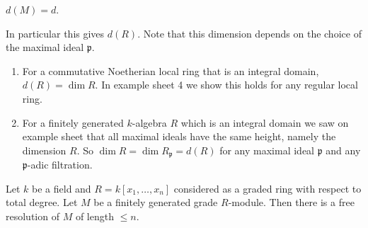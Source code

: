 \documentclass[a4paper]{article}
\begin{document}
\begin{definition}
  \(d(M) = d\).
\end{definition}

In particular this gives \(d(R)\). Note that this dimension depends on the choice of the maximal ideal \(\mathfrak p\).

\begin{remark}\leavevmode
  \begin{enumerate}
  \item For a commutative Noetherian local ring that is an integral domain, \(d(R) = \dim R\). In example sheet 4 we show this holds for any regular local ring.
  \item For a finitely generated \(k\)-algebra \(R\) which is an integral domain we saw on example sheet that all maximal ideals have the same height, namely the dimension \(R\). So \(\dim R = \dim R_{\mathfrak p} = d(R)\) for any maximal ideal \(\mathfrak p\) and any \(\mathfrak p\)-adic filtration.
  \end{enumerate}
\end{remark}

\begin{theorem}
  Let \(k\) be a field and \(R = k[x_1, \dots, x_n]\) considered as a graded ring with respect to total degree. Let \(M\) be a finitely generated grade \(R\)-module. Then there is a free resolution of \(M\) of length \(\leq n\).
\end{theorem}
\end{document}
